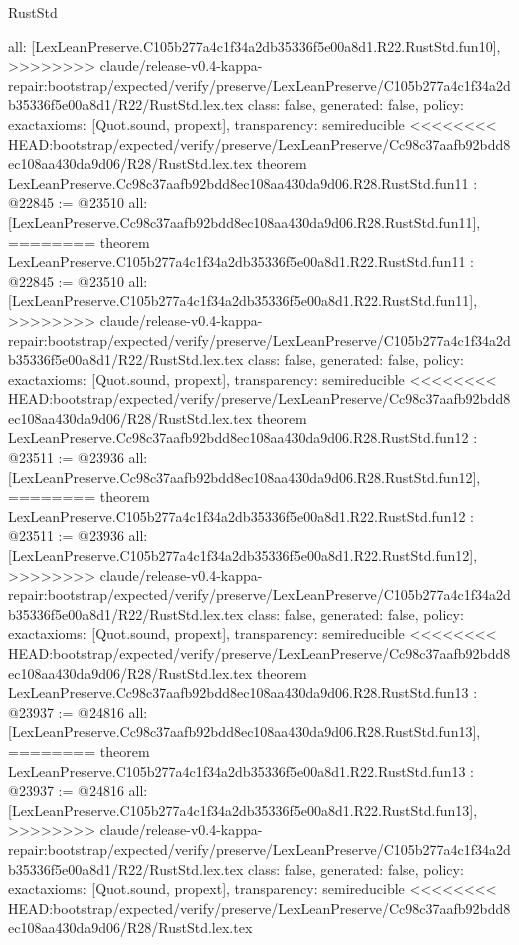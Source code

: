 \begin{lexlean}{RustStd}
\begin{coremodule}
{\begin{coremodule}
{{{{{{{{{{{{{{  all: [LexLeanPreserve.C105b277a4c1f34a2db35336f5e00a8d1.R22.RustStd.fun10],
>>>>>>>> claude/release-v0.4-kappa-repair:bootstrap/expected/verify/preserve/LexLeanPreserve/C105b277a4c1f34a2db35336f5e00a8d1/R22/RustStd.lex.tex
  class: false,
  generated: false,
  policy: exact{axioms: [Quot.sound, propext]},
  transparency: semireducible
}
<<<<<<<< HEAD:bootstrap/expected/verify/preserve/LexLeanPreserve/Cc98c37aafb92bdd8ec108aa430da9d06/R28/RustStd.lex.tex
theorem LexLeanPreserve.Cc98c37aafb92bdd8ec108aa430da9d06.R28.RustStd.fun11 : @22845 := @23510 {
  all: [LexLeanPreserve.Cc98c37aafb92bdd8ec108aa430da9d06.R28.RustStd.fun11],
========
theorem LexLeanPreserve.C105b277a4c1f34a2db35336f5e00a8d1.R22.RustStd.fun11 : @22845 := @23510 {
  all: [LexLeanPreserve.C105b277a4c1f34a2db35336f5e00a8d1.R22.RustStd.fun11],
>>>>>>>> claude/release-v0.4-kappa-repair:bootstrap/expected/verify/preserve/LexLeanPreserve/C105b277a4c1f34a2db35336f5e00a8d1/R22/RustStd.lex.tex
  class: false,
  generated: false,
  policy: exact{axioms: [Quot.sound, propext]},
  transparency: semireducible
}
<<<<<<<< HEAD:bootstrap/expected/verify/preserve/LexLeanPreserve/Cc98c37aafb92bdd8ec108aa430da9d06/R28/RustStd.lex.tex
theorem LexLeanPreserve.Cc98c37aafb92bdd8ec108aa430da9d06.R28.RustStd.fun12 : @23511 := @23936 {
  all: [LexLeanPreserve.Cc98c37aafb92bdd8ec108aa430da9d06.R28.RustStd.fun12],
========
theorem LexLeanPreserve.C105b277a4c1f34a2db35336f5e00a8d1.R22.RustStd.fun12 : @23511 := @23936 {
  all: [LexLeanPreserve.C105b277a4c1f34a2db35336f5e00a8d1.R22.RustStd.fun12],
>>>>>>>> claude/release-v0.4-kappa-repair:bootstrap/expected/verify/preserve/LexLeanPreserve/C105b277a4c1f34a2db35336f5e00a8d1/R22/RustStd.lex.tex
  class: false,
  generated: false,
  policy: exact{axioms: [Quot.sound, propext]},
  transparency: semireducible
}
<<<<<<<< HEAD:bootstrap/expected/verify/preserve/LexLeanPreserve/Cc98c37aafb92bdd8ec108aa430da9d06/R28/RustStd.lex.tex
theorem LexLeanPreserve.Cc98c37aafb92bdd8ec108aa430da9d06.R28.RustStd.fun13 : @23937 := @24816 {
  all: [LexLeanPreserve.Cc98c37aafb92bdd8ec108aa430da9d06.R28.RustStd.fun13],
========
theorem LexLeanPreserve.C105b277a4c1f34a2db35336f5e00a8d1.R22.RustStd.fun13 : @23937 := @24816 {
  all: [LexLeanPreserve.C105b277a4c1f34a2db35336f5e00a8d1.R22.RustStd.fun13],
>>>>>>>> claude/release-v0.4-kappa-repair:bootstrap/expected/verify/preserve/LexLeanPreserve/C105b277a4c1f34a2db35336f5e00a8d1/R22/RustStd.lex.tex
  class: false,
  generated: false,
  policy: exact{axioms: [Quot.sound, propext]},
  transparency: semireducible
}
<<<<<<<< HEAD:bootstrap/expected/verify/preserve/LexLeanPreserve/Cc98c37aafb92bdd8ec108aa430da9d06/R28/RustStd.lex.tex
}}}}}}}}}}}}}}}}
\end{coremodule}}
\end{coremodule}
\end{lexlean}
